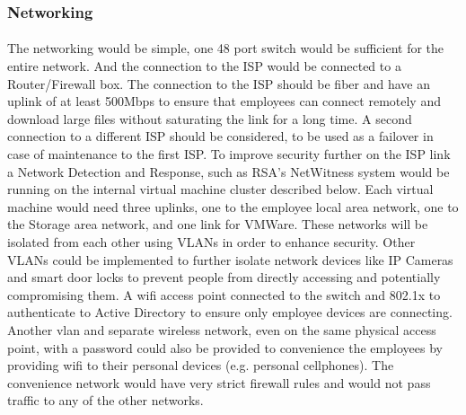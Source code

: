 \documentclass{article}
\begin{document}
\subsubsection{Networking} \paragraph{} The networking would be simple, one 48 port switch would be sufficient for the entire network. And the connection to the ISP would be connected to a Router/Firewall box. The connection to the ISP should be fiber and have an uplink of at least 500Mbps to ensure that employees can connect remotely and download large files without saturating the link for a long time. A second connection to a different ISP should be considered, to be used as a failover in case of maintenance to the first ISP. To improve security further on the ISP link a Network Detection and Response, such as RSA's NetWitness system would be running on the internal virtual machine cluster described below. Each virtual machine would need three uplinks, one to the employee local area network, one to the Storage area network, and one link for VMWare. These networks will be isolated from each other using VLANs in order to enhance security. Other VLANs could be implemented to further isolate network devices like IP Cameras and smart door locks to prevent people from directly accessing and potentially compromising them. A wifi access point connected to the switch and 802.1x to authenticate to Active Directory to ensure only employee devices are connecting. Another vlan and separate wireless network, even on the same physical access point, with a password could also be provided to convenience the employees by providing wifi to their personal devices (e.g. personal cellphones). The convenience network would have very strict firewall rules and would not pass traffic to any of the other networks.
\end{document}
